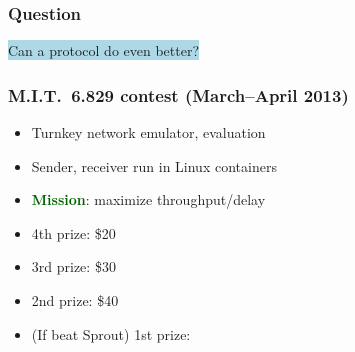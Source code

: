 \documentclass[svgnames]{beamer}
\begin{document}
\begin{frame}
\frametitle{Question}

\begin{centering}
\colorbox{LightBlue}{
\LARGE Can a protocol do even better?}

\end{centering}

\end{frame}

\begin{frame}
\frametitle{M.I.T.~6.829 contest (March--April 2013)}

\begin{itemize}
\item Turnkey network emulator, evaluation

\item Sender, receiver run in Linux containers

\item \textbf{\textcolor{DarkGreen}{Mission}}: maximize throughput/delay

\item 4th prize: \$20

\item 3rd prize: \$30

\item 2nd prize: \$40

\item (If beat Sprout) 1st prize: \pause {\color{DarkBlue}{\bf Co-authorship on future paper}}

\end{itemize}

\vspace{\baselineskip}
\vspace{\baselineskip}
\vspace{\baselineskip}


\end{frame}
\end{document}
